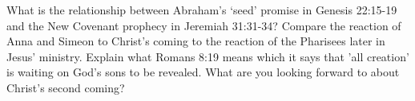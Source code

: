 \begin{questions}
\q What is the relationship between Abraham's `seed' promise in Genesis 22:15-19 and the New Covenant prophecy in Jeremiah 31:31-34?
\q Compare the reaction of Anna and Simeon to Christ's coming to the reaction of the Pharisees later in Jesus' ministry.
\q Explain what Romans 8:19 means which it says that 'all creation' is waiting on God's sons to be revealed.
\q What are you looking forward to about Christ's second coming?
\end{questions}